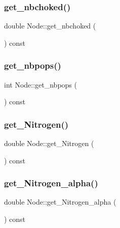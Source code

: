 \mbox{\label{class_node_a0c3328627d09b544fb4df912fd64cc02}} 
\subsubsection{\texorpdfstring{get\_nbchoked()}{get\_nbchoked()}}
{\footnotesize\ttfamily double Node\+::get\+\_\+nbchoked (\begin{DoxyParamCaption}{ }\end{DoxyParamCaption}) const}

\mbox{\label{class_node_ab1065def4c8f5a597d377ac21b8c5e49}} 
\subsubsection{\texorpdfstring{get\_nbpops()}{get\_nbpops()}}
{\footnotesize\ttfamily int Node\+::get\+\_\+nbpops (\begin{DoxyParamCaption}{ }\end{DoxyParamCaption}) const\hspace{0.3cm}{\ttfamily [inline]}}

\mbox{\label{class_node_ac74bf05cc20e1ae429279f036ecb3e6b}} 
\subsubsection{\texorpdfstring{get\_Nitrogen()}{get\_Nitrogen()}}
{\footnotesize\ttfamily double Node\+::get\+\_\+\+Nitrogen (\begin{DoxyParamCaption}{ }\end{DoxyParamCaption}) const}

\mbox{\label{class_node_aa2ef7c5a2ac1108aac7585324ba68ae7}} 
\subsubsection{\texorpdfstring{get\_Nitrogen\_alpha()}{get\_Nitrogen\_alpha()}}
{\footnotesize\ttfamily double Node\+::get\+\_\+\+Nitrogen\+\_\+alpha (\begin{DoxyParamCaption}{ }\end{DoxyParamCaption}) const}

